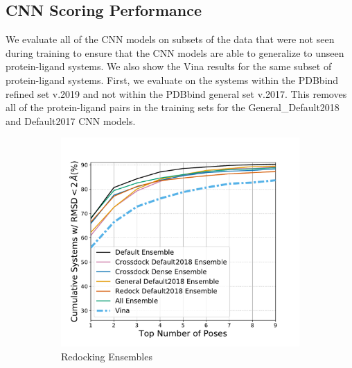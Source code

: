 \documentclass[journal=jcisd8,manuscript=article]{achemso}
\begin{document}
\subsection{CNN Scoring Performance}
We evaluate all of the CNN models on subsets of the data that were not seen  during training to ensure that the CNN models are able to generalize to unseen protein-ligand systems. We also show the Vina results for the same subset of protein-ligand systems. First, we evaluate on the systems within the PDBbind refined set v.2019 and not within the PDBbind general set v.2017. This removes all of the protein-ligand pairs in the training sets for the General\_Default2018 and Default2017 CNN models.
\begin{figure}    
	\begin{subfigure}[b]{0.48\textwidth}    
		\centering
		\includegraphics[width=\textwidth]{figures/redocking/ensemble_models_no2017_line.pdf}
		\caption{Redocking Ensembles}
		\label{fig:No2017EnsRD}
    \end{subfigure}    
    \begin{subfigure}[b]{0.48\textwidth}    
		\centering

\end{subfigure}
\end{figure}
\end{document}
